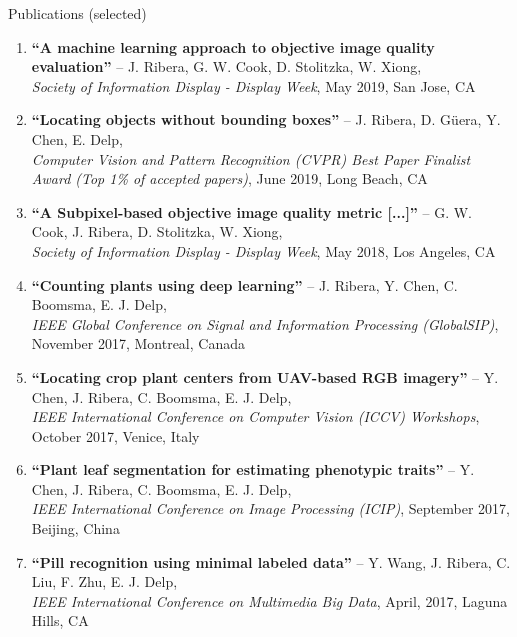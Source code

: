 \documentclass{resume} %
\begin{document}
\begin{rSection}{Publications (selected)}

\footnotesize
\begin{enumerate}
\setlength{\itemindent}{-.1in}
\item 
\textbf{``A machine learning approach to objective image quality evaluation''} -- J. Ribera, G. W. Cook, D. Stolitzka, W. Xiong, \\
        \emph{Society of Information Display - Display Week}, May 2019, San Jose, CA
\item 
\textbf{``Locating objects without bounding boxes''} -- J. Ribera, D. Güera, Y. Chen, E. Delp, \\
\emph{Computer Vision and Pattern Recognition (CVPR) Best Paper Finalist Award (Top 1\% of accepted papers)}, June 2019, Long Beach, CA
\item 
    \textbf{``A Subpixel-based objective image quality metric [...]''} -- G. W. Cook, J. Ribera, D. Stolitzka, W. Xiong, \\
    \emph{Society of Information Display - Display Week}, May 2018, Los Angeles, CA
\item 
\textbf{``Counting plants using deep learning''} -- J. Ribera, Y. Chen, C. Boomsma, E. J. Delp, \\
		\emph{IEEE Global Conference on Signal and Information Processing (GlobalSIP)}, November 2017, Montreal, Canada
\item 
\textbf{``Locating crop plant centers from UAV-based RGB imagery''} -- Y. Chen, J. Ribera, C. Boomsma, E. J. Delp, \\
\emph{IEEE International Conference on Computer Vision (ICCV) Workshops}, October 2017, Venice, Italy
\item 
\textbf{``Plant leaf segmentation for estimating phenotypic traits''} -- Y. Chen, J. Ribera, C. Boomsma, E. J. Delp, \\
\emph{IEEE International Conference on Image Processing (ICIP)}, September 2017, Beijing, China
\item 
\textbf{``Pill recognition using minimal labeled data''} -- Y. Wang, J. Ribera, C. Liu, F. Zhu, E. J. Delp, \\
		\emph{IEEE International Conference on Multimedia Big Data}, April, 2017, Laguna Hills, CA %

\end{enumerate}
\end{rSection}
\end{document}

